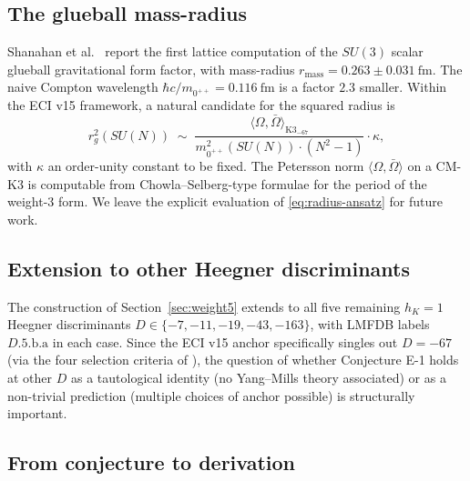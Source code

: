 \documentclass[11pt,a4paper]{amsart}
\theoremstyle{definition}
\begin{document}
\subsection{The glueball mass-radius}

Shanahan et al.~\cite{Shanahan2026} report the first lattice computation of the
$SU(3)$ scalar glueball gravitational form factor, with mass-radius
$r_{\mathrm{mass}} = 0.263 \pm 0.031~\mathrm{fm}$. The naive Compton wavelength
$\hbar c / m_{0^{++}} = 0.116~\mathrm{fm}$ is a factor $2.3$ smaller. Within the
ECI v15 framework, a natural candidate for the squared radius is
\begin{equation}\label{eq:radius-ansatz}
r_{g}^{2}(SU(N)) \;\sim\; \frac{\langle \Omega, \bar\Omega \rangle_{\mathrm{K3}_{-67}}}{m_{0^{++}}^{2}(SU(N)) \cdot (N^{2} - 1)} \cdot \kappa,
\end{equation}
with $\kappa$ an order-unity constant to be fixed. The Petersson norm
$\langle \Omega, \bar\Omega \rangle$ on a CM-K3 is computable from
Chowla--Selberg-type formulae for the period of the weight-$3$ form.
We leave the explicit evaluation of \eqref{eq:radius-ansatz} for future work.

\subsection{Extension to other Heegner discriminants}

The construction of Section~\ref{sec:weight5} extends to all five remaining
$h_{K} = 1$ Heegner discriminants $D \in \{-7, -11, -19, -43, -163\}$, with
LMFDB labels $D.5.\mathrm{b}.\mathrm{a}$ in each case. Since the ECI v15
anchor specifically singles out $D = -67$ (via the four selection criteria of
\cite[\S1.3]{E08Maxwell}), the question of whether Conjecture E-1 holds at
other $D$ as a tautological identity (no Yang--Mills theory associated) or as a
non-trivial prediction (multiple choices of anchor possible) is structurally
important.

\subsection{From conjecture to derivation}
\end{document}
